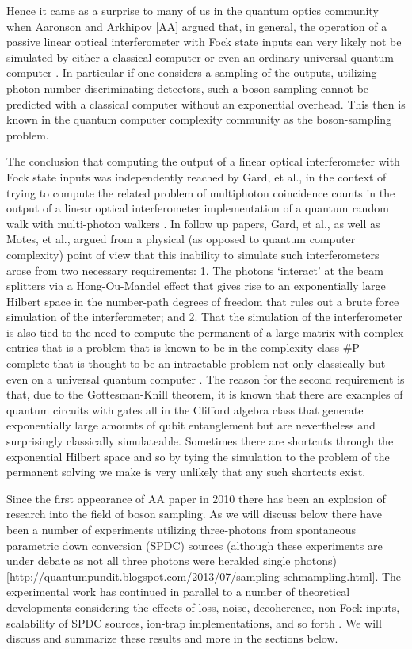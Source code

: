 \documentclass[aps,pra,twocolumn,amsmath,amssymb,nofootinbib,superscriptaddress]{revtex4}
\begin{document}
	Hence it came as a surprise to many of us in the quantum optics community when Aaronson and Arkhipov [AA] argued that, in general, the operation of a passive linear optical interferometer with Fock state inputs can very likely not be simulated by either a classical computer or even an ordinary universal quantum computer \cite{aar}. In particular if one considers a sampling of the outputs, utilizing photon number discriminating detectors, such a boson sampling cannot be predicted with a classical computer without an exponential overhead. This then is known in the quantum computer complexity community as the boson-sampling problem. 

	The conclusion that computing the output of a linear optical interferometer with Fock state inputs was independently reached by Gard, et al., in the context of trying to compute the related problem of multiphoton coincidence counts in the output of a linear optical interferometer implementation of a quantum random walk with multi-photon walkers \cite{gard2}. In follow up papers, Gard, et al., as well as Motes, et al., argued from a physical (as opposed to quantum computer complexity) point of view that this inability to simulate such interferometers arose from two necessary requirements: 1. The photons ‘interact’ at the beam splitters via a Hong-Ou-Mandel effect that gives rise to an exponentially large Hilbert space in the number-path degrees of freedom that rules out a brute force simulation of the interferometer; and 2. That the simulation of the interferometer is also tied to the need to compute the permanent of a large matrix with complex entries that is a problem that is known to be in the complexity class \#P complete that is thought to be an intractable problem not only classically but even on a universal quantum computer \cite{gard, motes}. The reason for the second requirement is that, due to the Gottesman-Knill theorem, it is known that there are examples of quantum circuits with gates all in the Clifford algebra class that generate exponentially large amounts of qubit entanglement but are nevertheless and surprisingly classically simulateable. Sometimes there are shortcuts through the exponential Hilbert space and so by tying the simulation to the problem of the permanent solving we make is very unlikely that any such shortcuts exist. 

	Since the first appearance of AA paper in 2010 there has been an explosion of research into the field of boson sampling. As we will discuss below there have been a number of experiments utilizing three-photons from spontaneous parametric down conversion (SPDC) sources (although these experiments are under debate as not all three photons were heralded single photons) \cite{ralph,broome,spring,anon,till,crespi} [http://quantumpundit.blogspot.com/2013/07/sampling-schmampling.html]. The experimental work has continued in parallel to a number of theoretical developments considering the effects of loss, noise, decoherence, non-Fock inputs, scalability of SPDC sources, ion-trap implementations, and so forth \cite{rohde1,rohde2,jiang,motes,shch}. We will discuss and summarize these results and more in the sections below. 
\end{document}
